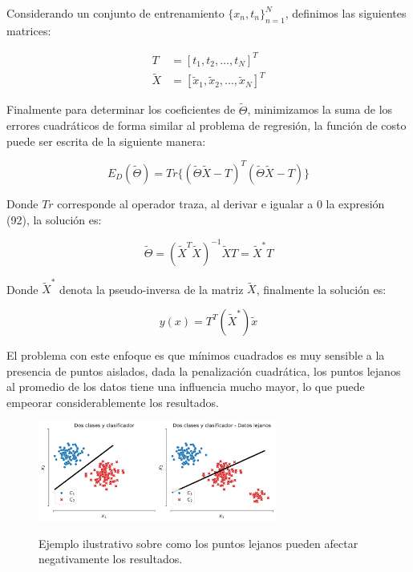 Considerando un conjunto de entrenamiento $\{x_n,t_n\}_{n=1}^N$, definimos las siguientes matrices:

\begin{align}
	T &= [t_1, t_2,\ldots, t_N]^T\\
	\tilde{X} &= [\tilde{x}_1, \tilde{x}_2, \ldots, \tilde{x}_N ]^T
\end{align}

Finalmente para determinar los coeficientes de $\tilde{\Theta}$, minimizamos la suma de los errores cuadráticos de forma similar al problema de regresión, la función de costo puede ser escrita de la siguiente manera:

\begin{equation}
	E_D(\tilde{\Theta}) = Tr\{(\tilde{\Theta}\tilde{X}-T)^T(\tilde{\Theta}\tilde{X}-T)\}
\end{equation}

Donde $Tr$ corresponde al operador traza, al derivar e igualar a 0 la expresión (92), la solución es:

\begin{equation}
	\tilde{\Theta} = (\tilde{X}^T\tilde{X})^{-1}\tilde{X}T = \tilde{X}^*T
\end{equation}

Donde $\tilde{X}^*$ denota la pseudo-inversa de la matriz $\tilde{X}$, finalmente la solución es:

\begin{equation}
y(x) = T^T(\tilde{X}^*)\tilde{x}
\end{equation}

El problema con este enfoque es que mínimos cuadrados es muy sensible a la presencia de puntos aislados, dada la penalización cuadrática, los puntos lejanos al promedio de los datos tiene una influencia mucho mayor, lo que puede empeorar considerablemente los resultados.


\begin{figure}[H]
	\centering
	\includegraphics[width=0.7\textwidth]{img/cap2_dosclases_clasificador.pdf}\\
	\caption{Ejemplo ilustrativo sobre como los puntos lejanos pueden afectar negativamente los resultados.}
	\label{fig:clasif_mse}
\end{figure}

